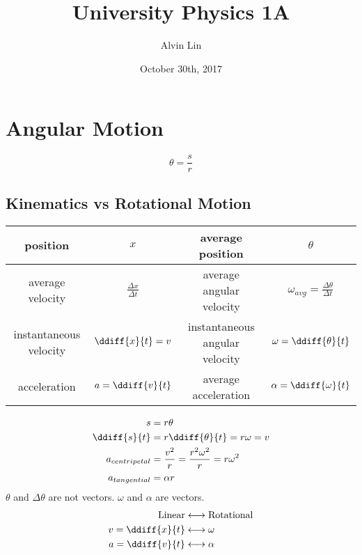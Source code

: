 \documentclass{math}
\title{University Physics 1A}
\author{Alvin Lin}
\date{October 30th, 2017}
\begin{document}
\maketitle

\section*{Angular Motion}
\begin{center}
\end{center}
\[ \theta = \frac{s}{r} \]

\subsection*{Kinematics vs Rotational Motion}
\begin{center}
  \renewcommand{\arraystretch}{1.5}
  \begin{tabular}{|c|c|c|c|}
    \hline
    position & \( x \) & average position & \( \theta \) \\
    \hline
    average velocity & \( \frac{\Delta x}{\Delta t} \) &
      average angular velocity &
      \( \omega_{avg} = \frac{\Delta\theta}{\Delta t} \) \\
    \hline
    instantaneous velocity & \( \ddiff{x}{t} = v \) &
      instantaneous angular velocity & \( \omega = \ddiff{\theta}{t} \) \\
    \hline
    acceleration & \( a = \ddiff{v}{t} \) & average acceleration &
      \( \alpha = \ddiff{\omega}{t} \) \\
    \hline
  \end{tabular}
\end{center}
\begin{align*}
  s &= r\theta \\
  \ddiff{s}{t} &= r\ddiff{\theta}{t} = r\omega = v \\
  a_{centripetal} &= \frac{v^2}{r} = \frac{r^2\omega^2}{r} = r\omega^2 \\
  a_{tangential} &= \alpha r
\end{align*}
\( \theta \) and \( \Delta\theta \) are not vectors. \( \omega \) and
\( \alpha \) are vectors.
\begin{align*}
  \text{Linear} &\longleftrightarrow \text{Rotational} \\
  v = \ddiff{x}{t} &\longleftrightarrow \omega \\
  a = \ddiff{v}{t} &\longleftrightarrow \alpha
\end{align*}
\end{document}
